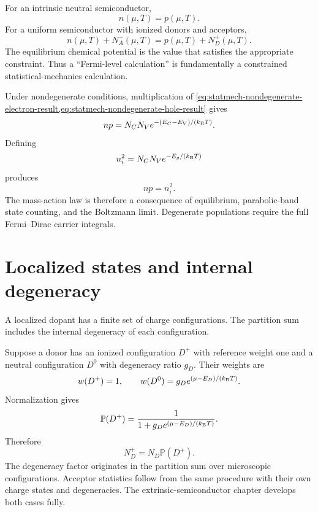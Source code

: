 For an intrinsic neutral semiconductor,
\begin{equation}
  n(\mu,T)=p(\mu,T).
  \label{eq:statmech-intrinsic-neutrality}
\end{equation}
For a uniform semiconductor with ionized donors and acceptors,
\begin{equation}
  n(\mu,T)+N_A^-(\mu,T)
  =p(\mu,T)+N_D^+(\mu,T).
  \label{eq:statmech-extrinsic-neutrality}
\end{equation}
The equilibrium chemical potential is the value that satisfies the appropriate
constraint.  Thus a ``Fermi-level calculation'' is fundamentally a constrained
statistical-mechanics calculation.

Under nondegenerate conditions, multiplication of
\cref{eq:statmech-nondegenerate-electron-result,eq:statmech-nondegenerate-hole-result}
gives
\begin{equation}
  np
  =N_CN_Ve^{-(E_C-E_V)/(k_{\mathrm B} T)}.
  \label{eq:statmech-carrier-product}
\end{equation}
Defining
\begin{equation}
  n_i^2=N_CN_Ve^{-E_g/(k_{\mathrm B} T)}
  \label{eq:statmech-intrinsic-product-definition}
\end{equation}
produces
\begin{equation}
  np=n_i^2.
  \label{eq:statmech-mass-action-law}
\end{equation}
The mass-action law is therefore a consequence of equilibrium, parabolic-band
state counting, and the Boltzmann limit.  Degenerate populations require the
full Fermi--Dirac carrier integrals.

\section{Localized states and internal degeneracy}

A localized dopant has a finite set of charge configurations.  The partition
sum includes the internal degeneracy of each configuration.

Suppose a donor has an ionized configuration $D^+$ with reference weight one
and a neutral configuration $D^0$ with degeneracy ratio $g_D$.  Their weights
are
\begin{equation}
  w(D^+)=1,
  \qquad
  w(D^0)=g_D e^{(\mu-E_D)/(k_{\mathrm B} T)}.
  \label{eq:statmech-donor-configuration-weights}
\end{equation}
Normalization gives
\begin{equation}
  \mathbb P(D^+)
  =\frac{1}{1+g_De^{(\mu-E_D)/(k_{\mathrm B} T)}}.
  \label{eq:statmech-donor-ionized-probability}
\end{equation}
Therefore
\begin{equation}
  N_D^+=N_D\mathbb P(D^+).
  \label{eq:statmech-ionized-donor-concentration}
\end{equation}
The degeneracy factor originates in the partition sum over microscopic
configurations.  Acceptor
statistics follow from the same procedure with their own charge states and
degeneracies.  The extrinsic-semiconductor chapter develops both cases fully.

